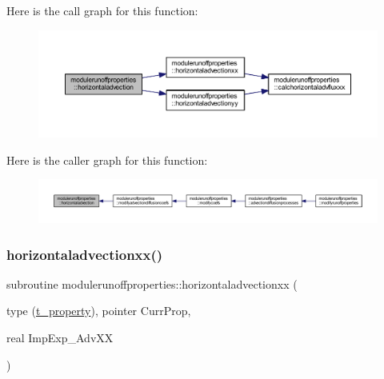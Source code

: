 Here is the call graph for this function\+:\nopagebreak
\begin{figure}[H]
\begin{center}
\leavevmode
\includegraphics[width=350pt]{namespacemodulerunoffproperties_a88919c7edf33d9d985c9378f1d5a24f9_cgraph}
\end{center}
\end{figure}
Here is the caller graph for this function\+:\nopagebreak
\begin{figure}[H]
\begin{center}
\leavevmode
\includegraphics[width=350pt]{namespacemodulerunoffproperties_a88919c7edf33d9d985c9378f1d5a24f9_icgraph}
\end{center}
\end{figure}
\mbox{\label{namespacemodulerunoffproperties_add33ed1dc6829db881e5d276d5354ef8}} 
\subsubsection{\texorpdfstring{horizontaladvectionxx()}{horizontaladvectionxx()}}
{\footnotesize\ttfamily subroutine modulerunoffproperties\+::horizontaladvectionxx (\begin{DoxyParamCaption}\item[{type (\mbox{\hyperlink{structmodulerunoffproperties_1_1t__property}{t\+\_\+property}}), pointer}]{Curr\+Prop,  }\item[{real}]{Imp\+Exp\+\_\+\+Adv\+XX }\end{DoxyParamCaption})\hspace{0.3cm}{\ttfamily [private]}}

